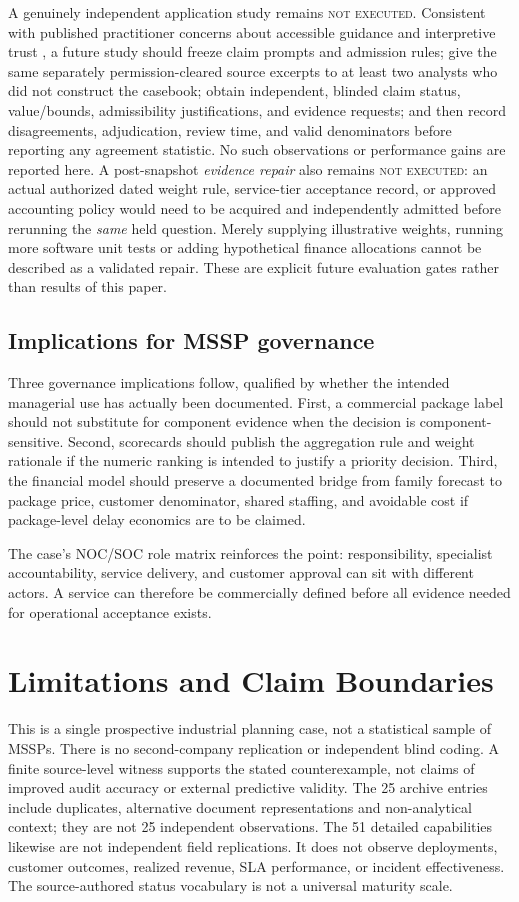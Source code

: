 \documentclass[systems,article,submit,moreauthors]{Definitions/mdpi}
\begin{document}
A genuinely independent application study remains \textsc{not executed}. Consistent with published practitioner concerns about accessible guidance and interpretive trust \cite{DiemertShorttWeber2025}, a future study should freeze claim prompts and admission rules; give the same separately permission-cleared source excerpts to at least two analysts who did not construct the casebook; obtain independent, blinded claim status, value/bounds, admissibility justifications, and evidence requests; and then record disagreements, adjudication, review time, and valid denominators before reporting any agreement statistic. No such observations or performance gains are reported here. A post-snapshot \emph{evidence repair} also remains \textsc{not executed}: an actual authorized dated weight rule, service-tier acceptance record, or approved accounting policy would need to be acquired and independently admitted before rerunning the \emph{same} held question. Merely supplying illustrative weights, running more software unit tests or adding hypothetical finance allocations cannot be described as a validated repair. These are explicit future evaluation gates rather than results of this paper.


\subsection{Implications for MSSP governance}
Three governance implications follow, qualified by whether the intended managerial use has actually been documented. First, a commercial package label should not substitute for component evidence when the decision is component-sensitive. Second, scorecards should publish the aggregation rule and weight rationale if the numeric ranking is intended to justify a priority decision. Third, the financial model should preserve a documented bridge from family forecast to package price, customer denominator, shared staffing, and avoidable cost if package-level delay economics are to be claimed.

The case's NOC/SOC role matrix reinforces the point: responsibility, specialist accountability, service delivery, and customer approval can sit with different actors. A service can therefore be commercially defined before all evidence needed for operational acceptance exists.

\section{Limitations and Claim Boundaries}
This is a single prospective industrial planning case, not a statistical sample of MSSPs. There is no second-company replication or independent blind coding. A finite source-level witness supports the stated counterexample, not claims of improved audit accuracy or external predictive validity. The 25 archive entries include duplicates, alternative document representations and non-analytical context; they are not 25 independent observations. The 51 detailed capabilities likewise are not independent field replications. It does not observe deployments, customer outcomes, realized revenue, SLA performance, or incident effectiveness. The source-authored status vocabulary is not a universal maturity scale.
\end{document}
